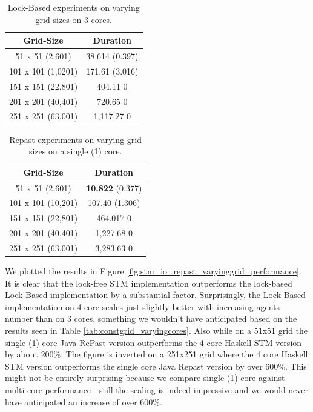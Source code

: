 \begin{table}
	\centering
  	\begin{tabular}{ c || c  }
        Grid-Size         & Duration  		\\ \hline \hline 
   		51 x 51   (2,601)  & 38.614 (0.397) \\ \hline
   		101 x 101 (1,0201) & 171.61 (3.016) \\ \hline
   		151 x 151 (22,801) & 404.11	0 		\\ \hline
   		201 x 201 (40,401) & 720.65 0 		\\ \hline 
   		251 x 251 (63,001) & 1,117.27 0 
  	\end{tabular}
  	
  	\caption{Lock-Based experiments on varying grid sizes on 3 cores.}
	\label{tab:varyinggrid_constcores3_IO}
\end{table}

\begin{table}
	\centering
  	\begin{tabular}{ c || c }
        Grid-Size          & Duration  				 \\ \hline \hline 
   		51 x 51 (2,601)    & \textbf{10.822} (0.377) \\ \hline
   		101 x 101 (10,201) & 107.40 (1.306) 		 \\ \hline
   		151 x 151 (22,801) & 464.017  0 			 \\ \hline
   		201 x 201 (40,401) & 1,227.68 0 			 \\ \hline 
   		251 x 251 (63,001) & 3,283.63 0 
  	\end{tabular}
  	
  	\caption{Repast experiments on varying grid sizes on a single (1) core.}
	\label{tab:varyinggrid_constcores_repast}
\end{table}

We plotted the results in Figure \ref{fig:stm_io_repast_varyinggrid_performance}. It is clear that the lock-free STM implementation outperforms the lock-based Lock-Based implementation by a substantial factor. Surprisingly, the Lock-Based implementation on 4 core scales just slightly better with increasing agents number than on 3 cores, something we wouldn't have anticipated based on the results seen in Table \ref{tab:constgrid_varyingcores}. Also  while on a 51x51 grid the single (1) core Java RePast version outperforms the 4 core Haskell STM version by about 200\%. The figure is inverted on a 251x251 grid where the 4 core Haskell STM version outperforms the single core Java Repast version by over 600\%. This might not be entirely surprising because we compare single (1) core against multi-core performance - still the scaling is indeed impressive and we would never have anticipated an increase of over 600\%.

